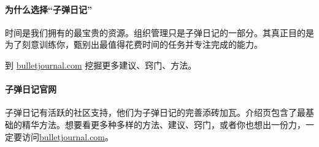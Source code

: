\documentclass[a5paper]{article}
\begin{document}
\paragraph{为什么选择“子弹日记”}

时间是我们拥有的最宝贵的资源。组织管理只是子弹日记的一部分。其真正目的是为了刻意训练你，甄别出最值得花费时间的任务并专注完成的能力。

到 \href{http://bulletjournal.com}{bulletjournal.com} 挖掘更多建议、窍门、方法。

\clearpage

\paragraph{子弹日记官网}

子弹日记有活跃的社区支持，他们为子弹日记的完善添砖加瓦。介绍页包含了最基础的精华方法。想要看更多种多样的方法、建议、窍门，或者你也想出一份力，一定要访问\href{http://bulletjournal.com}{bulletjournal.com}。
\end{document}
